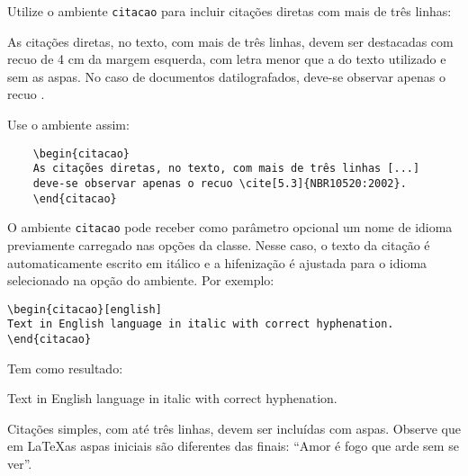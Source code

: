Utilize o ambiente \texttt{citacao} para incluir
citações diretas com mais de três linhas:

\begin{citacao}
As citações diretas, no texto, com mais de três linhas, devem ser
destacadas com recuo de 4 cm da margem esquerda, com letra menor que a do texto
utilizado e sem as aspas. No caso de documentos datilografados, deve-se
observar apenas o recuo \cite[5.3]{NBR10520:2002}.
\end{citacao}

Use o ambiente assim:
\begin{center}
  \begin{verbatim}
    \begin{citacao}
    As citações diretas, no texto, com mais de três linhas [...]
    deve-se observar apenas o recuo \cite[5.3]{NBR10520:2002}.
    \end{citacao}
    \end{verbatim}
\end{center}


O ambiente \texttt{citacao} pode receber como parâmetro opcional um nome de
idioma previamente carregado nas opções da classe. Nesse
caso, o texto da citação é automaticamente escrito em itálico e a hifenização é
ajustada para o idioma selecionado na opção do ambiente. Por exemplo:

\begin{verbatim}
\begin{citacao}[english]
Text in English language in italic with correct hyphenation.
\end{citacao}
\end{verbatim}

Tem como resultado:

\begin{citacao}[english]
Text in English language in italic with correct hyphenation.
\end{citacao}

Citações simples, com até três linhas, devem ser
incluídas com aspas. Observe que em \LaTeX as aspas iniciais são diferentes das
finais: ``Amor é fogo que arde sem se ver''.